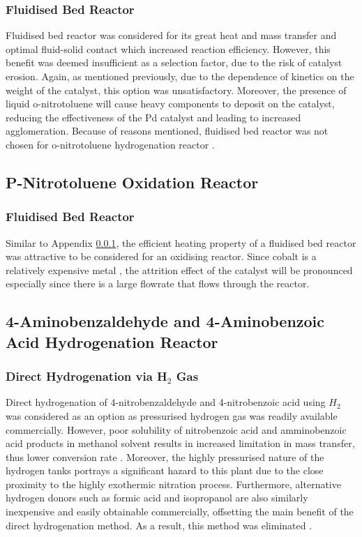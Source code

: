 \subsubsection{Fluidised Bed Reactor}
\label{fbr}
Fluidised bed reactor was considered for its great heat and mass transfer and optimal fluid-solid contact which increased reaction efficiency. However, this benefit was deemed insufficient as a selection factor, due to the risk of catalyst erosion. Again, as mentioned previously, due to the dependence of kinetics on the weight of the catalyst, this option was unsatisfactory. Moreover, the presence of liquid o-nitrotoluene will cause heavy components to deposit on the catalyst, reducing the effectiveness of the Pd catalyst and leading to increased agglomeration. Because of reasons mentioned, fluidised bed reactor was not chosen for o-nitrotoluene hydrogenation reactor \cite{farrell_kinetics_1979}.

\subsection{P-Nitrotoluene Oxidation Reactor}
\subsubsection{Fluidised Bed Reactor}
Similar to Appendix \ref{fbr}, the efficient heating property of a fluidised bed reactor was attractive to be considered for an oxidising reactor. Since cobalt is a relatively expensive metal \cite{saib_fundamental_2014}, the attrition effect of the catalyst will be pronounced especially since there is a large flowrate that flows through the reactor.

\subsection{4-Aminobenzaldehyde and 4-Aminobenzoic Acid Hydrogenation Reactor}
\subsubsection{Direct Hydrogenation via H$_2$ Gas}

Direct hydrogenation of 4-nitrobenzaldehyde and 4-nitrobenzoic acid using $H_2$ was considered as an option as pressurised hydrogen gas was readily available commercially. However, poor solubility of nitrobenzoic acid and amminobenzoic acid products in methanol solvent results in increased limitation in mass transfer, thus lower conversion rate \cite{rahman_fast_2020}. Moreover, the highly pressurised nature of the hydrogen tanks portrays a significant hazard to this plant due to the close proximity to the highly exothermic nitration process. Furthermore, alternative hydrogen donors such as formic acid and isopropanol are also similarly inexpensive and easily obtainable commercially, offsetting the main benefit of the direct hydrogenation method. As a result, this method was eliminated \cite{wang_golden_nodate}. 



